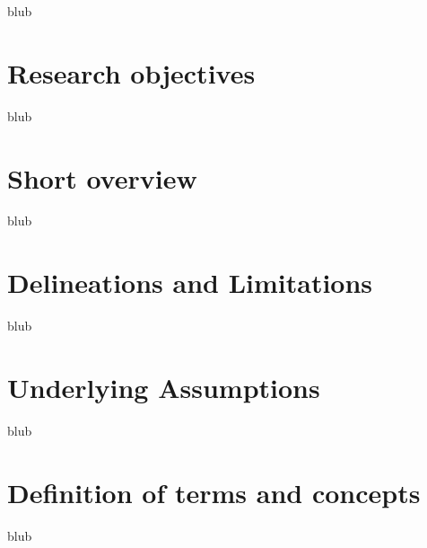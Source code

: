 blub



\section{Research objectives}

blub



\section{Short overview}

blub



\section{Delineations and Limitations}

blub



\section{Underlying Assumptions}

blub



\section{Definition of terms and concepts}

blub


